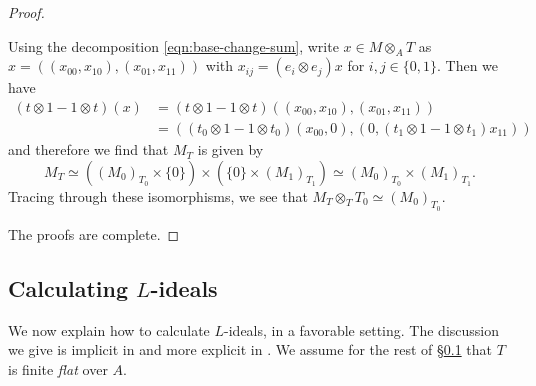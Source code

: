 \documentclass[10pt, twoside]{amsart}
\theoremstyle{plain}
\theoremstyle{definition}
\theoremstyle{remark}
\numberwithin{equation}{subsection}
\begin{document}
\begin{proof}
\begin{enumerate}[label=(\alph*)]
{Using the decomposition \eqref{eqn:base-change-sum}, write $x\in M\otimes_AT$ as $x=((x_{00},x_{10}),(x_{01},x_{11}))$ with $x_{ij}=(e_i\otimes e_j)x$ for $i,j\in\{0,1\}$. Then we have 
\[\begin{split}
(t\otimes 1-1\otimes t)(x)&=(t\otimes 1-1\otimes t)((x_{00},x_{10}),(x_{01},x_{11}))\\
&=((t_0\otimes1-1\otimes t_0)(x_{00},0),(0,(t_1\otimes 1-1\otimes t_1)x_{11}))
\end{split}\] 
and therefore we find that $M_T$ is given by
\begin{equation*}
M_T \simeq \left((M_0)_{T_0} \times\{0\}\right)\times \left(\{0\}\times (M_1)_{T_1}\right)\simeq (M_0)_{T_0}\times (M_1)_{T_1}.
\end{equation*}
Tracing through these isomorphisms, we see that $M_T\otimes_T T_0 \simeq (M_0)_{T_0}$.}
\end{enumerate}
The proofs are complete.
\end{proof}

\subsection{Calculating $L$-ideals}\label{subsec:calculating-Lideals}

We now explain how to calculate $L$-ideals, in a favorable setting. The discussion we give is implicit in \cite[\S 9.4]{Bel} and more explicit in \cite[p.\ 53-56]{Bel-Critical}. We assume for the rest of \S \ref{subsec:calculating-Lideals} that $T$ is finite {\em flat} over $A$. 
\end{document}
